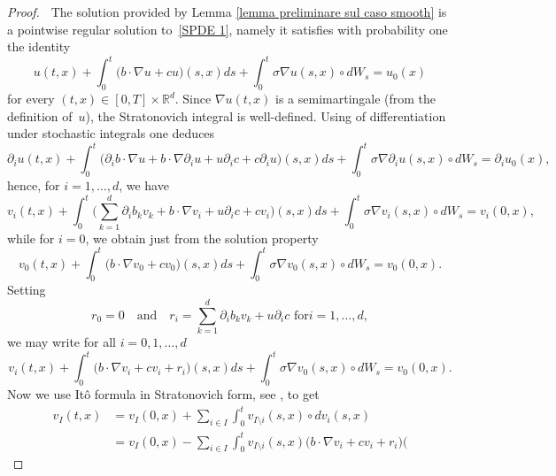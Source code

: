 \documentclass[a4paper,10pt]{article}
\newcommand\1{\mathbbm{1}}
\numberwithin{equation}{section}
\begin{document}
\begin{proof}
\textbf{\ }The solution provided by Lemma
\ref{lemma preliminare sul caso smooth} is a pointwise regular solution to~\eqref{SPDE 1}, namely it satisfies with probability one the
identity
\begin{equation*}
u(t,x)  +\int_{0}^{t} \big(b\cdot\nabla u+cu\big)  (
s,x)  ds+\int_{0}^{t}\sigma\nabla u(s,x)  \circ
dW_{s}=u_{0}(x)
\end{equation*}
for every $(t,x) \in [0,T]  \times\mathbb{R}^{d}$.
Since $\nabla u(t,x)$ is a semimartingale (from the definition of~$u$), the Stratonovich integral is well-defined. Using \cite[Theorem 7.10]{KUNITA84} of differentiation under stochastic integrals one deduces
\begin{equation*}
\partial_{i}u(t,x)  +\int_{0}^{t} \big(\partial_{i}b\cdot\nabla
u+b\cdot\nabla\partial_{i}u+u\partial_{i}c+c\partial_{i}u \big)  (
s,x)  ds+\int_{0}^{t}\sigma\nabla\partial_{i}u(s,x)  \circ
dW_{s}=\partial_{i}u_{0}(x),
\end{equation*}
hence, for $i=1,\ldots,d$, we have
\begin{equation*}
v_{i}(t,x)  +\int_{0}^{t}\Big(\sum_{k=1}^{d}\partial_{i}
b_{k}v_{k}+b\cdot\nabla v_{i}+u\partial_{i}c+cv_{i}\Big)  (
s,x)  ds+\int_{0}^{t}\sigma\nabla v_{i}(s,x)  \circ
dW_{s}=v_{i}(0,x),
\end{equation*}
while for $i=0$, we obtain just from the solution property
\begin{equation*}
v_{0}(t,x)  +\int_{0}^{t} \big(b\cdot\nabla v_{0}
+cv_{0}\big)  (s,x)  ds+\int_{0}^{t}\sigma\nabla v_{0}(
s,x)  \circ dW_{s}=v_{0}(0,x)  .
\end{equation*}
Setting
\begin{equation*}
r_{0} =0 \quad \text{and} \quad r_{i} =\sum_{k=1}^{d}\partial_{i}b_{k}v_{k}+u\partial_{i}c\text{ \ for
}i=1,\ldots,d ,
\end{equation*}
we may write for all $i=0,1,\ldots,d$
\begin{equation*}
v_{i}(t,x)  +\int_{0}^{t} \big(b\cdot\nabla v_{i}+cv_{i}
+r_{i}\big)  (s,x)  ds+\int_{0}^{t}\sigma\nabla v_{0}(
s,x)  \circ dW_{s}=v_{0}(0,x).
\end{equation*}
Now we use It\^{o} formula in Stratonovich form, see \cite[Theorem 8.3]{KUNITA84},
to get
\begin{align*}
v_{I}(t,x)   &  =v_{I}(0,x)  +\sum_{i\in I}\int 
_{0}^{t}v_{I\setminus i}(s,x)  \circ dv_{i}(s,x) \\
&  =v_{I}(0,x)  -\sum_{i\in I}\int_{0}^{t}v_{I\setminus i}(
s,x)  \big(b\cdot\nabla v_{i}+cv_{i}+r_{i}\big)  (

\end{align*}
\end{proof}
\end{document}
